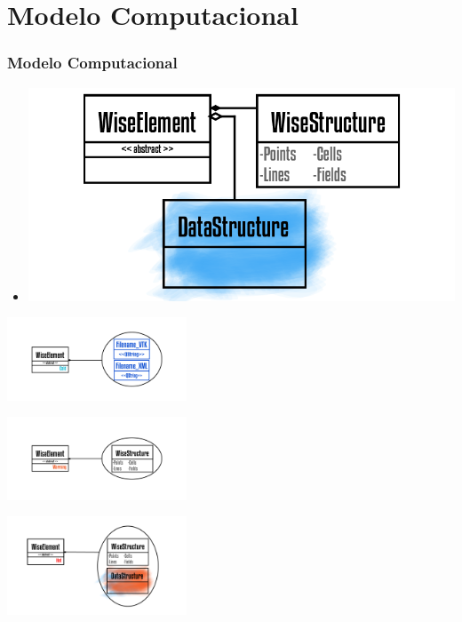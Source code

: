 \documentclass[10pt]{beamer}
\theoremstyle{remark}
\theoremstyle{definition}
\begin{document}
	\section{Modelo Computacional}
	\begin{frame}[allowframebreaks]
		\frametitle{Modelo Computacional}
		
		\begin{itemize}
			
			\item \includegraphics[width=1\textwidth]{images/Prancheta 2_2@4x.png}
			
		\end{itemize}
		
		\framebreak
		
		\begin{flushleft}
			\includegraphics[width=0.4\textwidth]{images/Prancheta 8@4x.png}
		\end{flushleft}
		\begin{center}
			\item \includegraphics[width=0.4\textwidth]{images/Prancheta 9@4x.png}
		\end{center}
		\begin{flushright}
			\includegraphics[width=0.4\textwidth]{images/Prancheta 10@4x.png}
		\end{flushright}
		

\end{frame}
\end{document}
